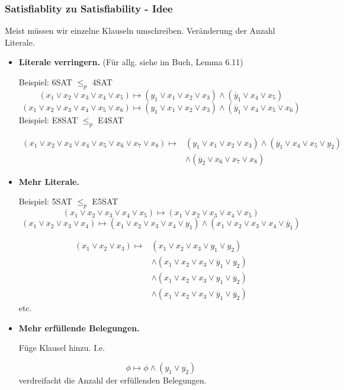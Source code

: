 \documentclass[a4paper, 11pt]{article}
\begin{document}
\subsubsection{Satisfiablity zu Satisfiability - Idee}
	Meist müssen wir einzelne Klauseln umschreiben. Veränderung der Anzahl Literale.
	\begin{itemize}[label=-]
		\item \textbf{Literale verringern.} (Für allg. siehe im Buch, Lemma 6.11)
			
		Beispiel: 6SAT $\leq_p$ 4SAT
			$$(x_1 \lor x_2 \lor x_3 \lor x_4 \lor x_5) \mapsto  (y_1 \lor x_1 \lor x_2 \lor x_3) \land (\overline{y}_1 \lor x_4 \lor x_5)$$
			$$(x_1 \lor x_2 \lor x_3 \lor x_4 \lor x_5 \lor x_6) \mapsto  (y_1 \lor x_1 \lor x_2 \lor x_3) \land (\overline{y}_1 \lor x_4 \lor x_5 \lor x_6)$$
			Beispiel: E8SAT $\leq_p$ E4SAT
			
			\begin{align*}
				(x_1 \lor x_2 \lor x_3 \lor x_4 \lor x_5 \lor x_6 \lor x_7 \lor x_8) \mapsto  &(y_1 \lor x_1 \lor x_2 \lor x_3) \land (\overline{y}_1 \lor x_4 \lor x_5 \lor y_2) \\
				&\land (\overline{y}_2 \lor x_6 \lor x_7 \lor x_8)
			\end{align*}

	\item \textbf{Mehr Literale.} 
	
			Beispiel: 5SAT $\leq_p$ E5SAT
			$$(x_1 \lor x_2 \lor x_3 \lor x_4 \lor x_5) \mapsto  (x_1 \lor x_2 \lor x_3 \lor x_4 \lor x_5)$$
			$$(x_1 \lor x_2 \lor x_3 \lor x_4) \mapsto  (x_1 \lor x_2 \lor x_3 \lor x_4 \lor y_1) \land (x_1 \lor x_2 \lor x_3 \lor x_4  \lor \overline{y}_1)$$
			
			\begin{align*}
				(x_1 \lor x_2 \lor x_3) \mapsto &(x_1 \lor x_2 \lor x_3 \lor y_1 \lor y_2) \\
			&\land (x_1 \lor x_2 \lor x_3 \lor \overline{y}_1 \lor y_2) \\
			&\land (x_1 \lor x_2 \lor x_3 \lor y_1 \lor \overline{y}_2) \\
			&\land (x_1 \lor x_2 \lor x_3 \lor \overline{y}_1 \lor \overline{y}_2)
			\end{align*}
			etc.

		\item \textbf{Mehr erfüllende Belegungen.}
		
		Füge Klausel hinzu. I.e.

		$$\phi \mapsto \phi \land (y_1 \lor y_2)$$
		verdreifacht die Anzahl der erfüllenden Belegungen.
	\end{itemize}
\end{document}
